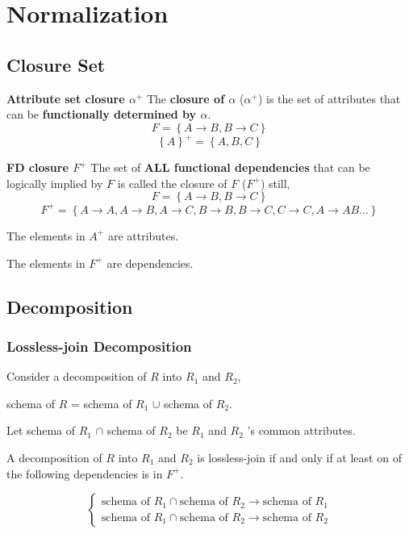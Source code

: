 \documentclass[11pt,a4paper]{article}
\begin{document}
\section{Normalization}
\subsection{Closure Set}
\textbf{Attribute set closure $\alpha^+$}
The \textbf{closure of $\alpha$} ($\alpha^+$) is the set of attributes that can be \textbf{functionally determined by $\alpha$}.
\[
F = \left\{A \rightarrow B, B \rightarrow C \right\}
\] 
\[
\left\{A \right\}^+ = \left\{A, B, C \right\}
\] \par

\textbf{FD closure $F^+$}
The set of \textbf{ALL functional dependencies} that can be logically implied by $F$ is called the closure of $F$ ($F^+$)
still,
\[
F = \left\{A \rightarrow B, B \rightarrow C \right\}
\] 
\[
F^+ = \left\{A \rightarrow A, A \rightarrow B, A \rightarrow C, B \rightarrow B, B \rightarrow C, C \rightarrow C, A \rightarrow AB \dots \right\}
\]

The elements in $A^+$ are attributes. \par
The elements in $F^+$ are dependencies. \par

\subsection{Decomposition}
\subsubsection{Lossless-join Decomposition}
Consider a decomposition of $R$ into $R_1$ and $R_2$, \par
schema of $R$ = schema of $R_1$ $\cup$ schema of $R_2$. \par
Let schema of $R_1$ $\cap$ schema of $R_2$ be $R_1$ and $R_2$ 's common attributes. \par
A decomposition of $R$ into $R_1$ and $R_2$ is lossless-join if and only if at least on of the following dependencies is in $F^+$. \par
\[
\begin{cases}
    \text{schema of } R_1 \cap \text{schema of } R_2 \rightarrow \text{schema of } R_1 \\
    \text{schema of } R_1 \cap \text{schema of } R_2 \rightarrow \text{schema of } R_2
\end{cases}
\]
\end{document}
